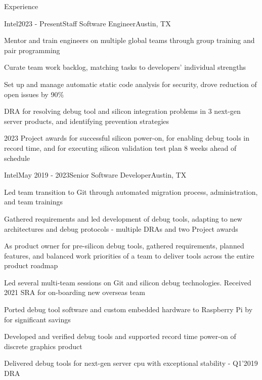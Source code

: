 \documentclass{resume} %
\begin{document}
\begin{rSection}{Experience}

\begin{rSubsection}{Intel}{2023 - Present}{Staff Software Engineer}{Austin, TX}
\item Mentor and train engineers on multiple global teams through group training and pair programming
\item Curate team work backlog, matching tasks to developers' individual strengths
\item Set up and manage automatic static code analysis for security, drove reduction of open issues by 90\%
\item DRA for resolving debug tool and silicon integration problems in 3 next-gen server products, and identifying prevention strategies
\item 2023 Project awards for successful silicon power-on, for enabling debug tools in record time, and for executing silicon validation test plan 8 weeks ahead of schedule
\end{rSubsection}

\begin{rSubsection}{Intel}{May 2019 - 2023}{Senior Software Developer}{Austin, TX}
\item Led team transition to Git through automated migration process, administration, and team trainings
\item Gathered requirements and led development of debug tools, adapting to new architectures and debug protocols - multiple DRAs and two Project awards
\item As product owner for pre-silicon debug tools, gathered requirements, planned features, and balanced work priorities of a team to deliver tools across the entire product roadmap
\item Led several multi-team sessions on Git and silicon debug technologies. Received 2021 SRA for on-boarding new overseas team
\item Ported debug tool software and custom embedded hardware to Raspberry Pi by for significant savings
\item Developed and verified debug tools and supported record time power-on of discrete graphics product
\item Delivered debug tools for next-gen server cpu with exceptional stability - Q1'2019 DRA
\end{rSubsection}


\end{rSection}
\end{document}

